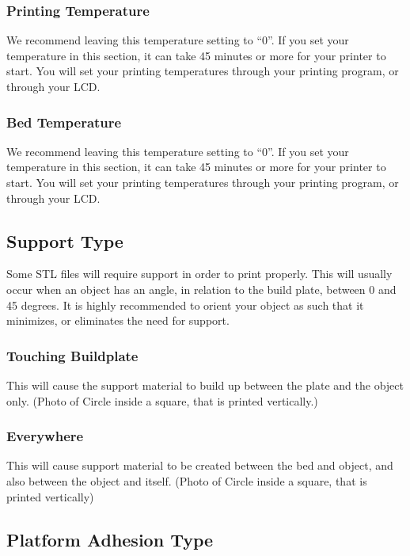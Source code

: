 \subsubsection{Printing Temperature}

We recommend leaving this temperature setting to “0”. If you set your 	temperature in this section, it can take 45 minutes or more for your printer to start. You will set your printing temperatures through your printing program, or through your LCD.

\subsubsection{Bed Temperature}

We recommend leaving this temperature setting to “0”. If you set your 	temperature in this section, it can take 45 minutes or more for your printer to start. You will set your printing temperatures through your printing program, or through your LCD.

\subsection{Support Type}

Some STL files will require support in order to print properly. This will usually occur when an object has an angle, in relation to the build plate, between 0 and 45 degrees. It is highly recommended to orient your object as such that it minimizes, or eliminates the need for support.

\subsubsection{Touching Buildplate}

This will cause the support material to build up between the plate 	and the object only. (Photo of Circle inside a square, that is printed vertically.)

\subsubsection{Everywhere}

This will cause support material to be created between the bed and object, 	and also between the object and itself. (Photo of Circle inside a square, that is printed vertically)

\subsection{Platform Adhesion Type}

